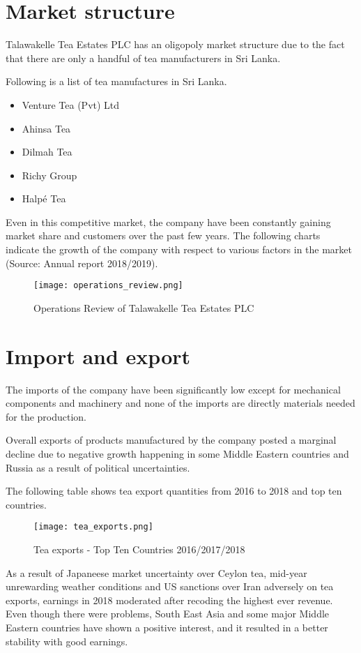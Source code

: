 \documentclass[12pt]{report}
\begin{document}
\chapter{Market structure}
Talawakelle Tea Estates PLC has an oligopoly market structure due to the fact that there are only a handful of tea manufacturers in Sri Lanka.

Following is a list of tea manufactures in Sri Lanka.
\begin{itemize}
	\item {Venture Tea (Pvt) Ltd}
	\item {Ahinsa Tea}
	\item {Dilmah Tea}
	\item {Richy Group}
	\item {Halpé Tea}
\end{itemize}

Even in this competitive market, the company have been constantly gaining market share and customers over the past few years. The following charts indicate the growth of the company with respect to various factors in the market (Source: Annual report 2018/2019).

\begin{figure}[H]
	\centering
	\texttt{[image: operations\_review.png]}
	\caption{Operations Review of Talawakelle Tea Estates PLC}
\end{figure}

\chapter{Import and export}
The imports of the company have been significantly low except for mechanical components and machinery and none of the imports are directly materials needed for the production.

Overall exports of products manufactured by the company posted a marginal decline due to negative growth happening in some Middle Eastern countries and Russia as a result of political uncertainties.

The following table shows tea export quantities from 2016 to 2018 and top ten countries.

\begin{figure}[H]
	\centering
	\texttt{[image: tea\_exports.png]}
	\caption{Tea exports - Top Ten Countries 2016/2017/2018}
\end{figure}

As a result of Japaneese market uncertainty over Ceylon tea, mid-year unrewarding weather conditions and US sanctions over Iran adversely on tea exports, earnings in 2018 moderated after recoding the highest ever revenue. Even though there were problems, South East Asia and some major Middle Eastern countries have shown a positive interest, and it resulted in a better stability with good earnings.
\end{document}
